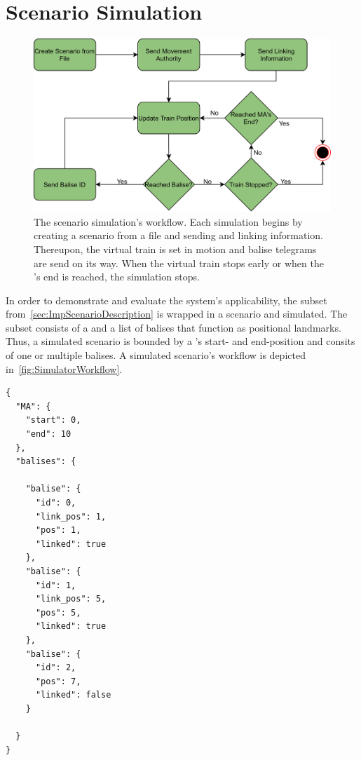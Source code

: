 \section{Scenario Simulation}
\label{subsec:ScenarioSimulation}
\begin{figure}[!hb]
	\centering
	\includegraphics[width=0.75\linewidth]{images/SimulatorWorkflow}
	\caption{The scenario simulation's workflow. Each simulation begins by creating a scenario from a file and sending  and linking information. Thereupon, the virtual train is set in motion and balise telegrams are send on its way. When the virtual train stops early or when the 's end is reached, the simulation stops.}
	\label{fig:SimulatorWorkflow}
\end{figure}
In order to demonstrate and evaluate the system's applicability, the  subset from~\autoref{sec:ImpScenarioDescription} is wrapped in a scenario and simulated.
The  subset consists of a  and a list of balises that function as positional landmarks.
Thus, a simulated scenario is bounded by a 's start- and end-position and consits of one or multiple balises.
A simulated scenario's workflow is depicted in~\autoref{fig:SimulatorWorkflow}.

\begin{lstlisting}[caption={A JSON scenario representation. Each scenario consists of a \glsentryfull{MA} with a start and end point, as well as of a set of balises. Balises can be either linked or not and consist of an identification number, a linking position and an actual position. The linking position is transmitted to the on-board unit and is distinguished from its actual position to simulate a misplaced balise.}, label=code:scenarioJSON]
{
  "MA": {
    "start": 0,
    "end": 10
  },
  "balises": {

    "balise": {
      "id": 0,
      "link_pos": 1,
      "pos": 1,
      "linked": true
    },
    "balise": {
      "id": 1,
      "link_pos": 5,
      "pos": 5,
      "linked": true
    },
    "balise": {
      "id": 2,
      "pos": 7,
      "linked": false
    }

  }
}

\end{lstlisting}

